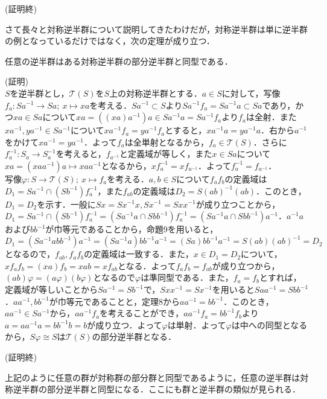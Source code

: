\documentclass{jsarticle}
\begin{document}
\begin{flushright}
(証明終)
\end{flushright}
さて長々と対称逆半群について説明してきたわけだが，対称逆半群は単に逆半群の例となっているだけではなく，次の定理が成り立つ．
\begin{thm}
任意の逆半群はある対称逆半群の部分逆半群と同型である．
\end{thm}
(証明)\\
$S$を逆半群とし，${\mathscr T}(S)$を$S$上の対称逆半群とする．$a\in S$に対して，写像$f_a:Sa^{-1}\rightarrow Sa;\:x\mapsto xa$を考える．$Sa^{-1}\subset S$より$Sa^{-1}f_a=Sa^{-1}a\subset Sa$であり，かつ$xa\in Sa$について$xa=((xa)a^{-1})a\in Sa^{-1}a=Sa^{-1}f_a$より$f_a$は全射．また$xa^{-1},ya^{-1}\in Sa^{-1}$について$xa^{-1}f_a=ya^{-1}f_a$とすると，$xa^{-1}a=ya^{-1}a$．右から$a^{-1}$をかけて$xa^{-1}=ya^{-1}$．よって$f_a$は全単射となるから，$f_a\in{\mathscr T}(S)$．さらに$f_a^{-1}:S_a\rightarrow S_a^{-1}$を考えると，$f_{a^{-1}}$と定義域が等しく，また$x\in Sa$について$xa=(xaa^{-1})a\mapsto xaa^{-1}$となるから，$xf_a^{-1}=xf_{a^{-1}}$．よって$f_a^{-1}=f_{a^{-1}}$．\\
写像$\varphi:S\rightarrow{\mathscr T}(S);\:x\mapsto f_a$を考える．$a,b\in S$について$f_af_b$の定義域は$D_1=Sa^{-1}\cap (Sb^{-1})f_a^{-1}$，また$f_{ab}$の定義域は$D_2=S(ab)^{-1}(ab)$．このとき，$D_1=D_2$を示す．一般に$Sx=Sx^{-1}x,Sx^{-1}=Sxx^{-1}$が成り立つことから，$D_1=Sa^{-1}\cap (Sb^{-1})f_a^{-1}=(Sa^{-1}a\cap Sbb^{-1})f_a^{-1}=(Sa^{-1}a\cap Sbb^{-1})a^{-1}$．$a^{-1}a$および$bb^{-1}$が巾等元であることから，命題9を用いると，$D_1=(Sa^{-1}abb^{-1})a^{-1}=(Sa^{-1}a)bb^{-1}a^{-1}=(Sa)bb^{-1}a^{-1}=S(ab)(ab)^{-1}=D_2$となるので，$f_{ab},f_af_b$の定義域は一致する．また，$x\in D_1=D_2$について，
$xf_af_b=(xa)f_b=xab=xf_{ab}$となる．よって$f_af_b=f_{ab}$が成り立つから，$(ab)\varphi=(a\varphi)(b\varphi)$となるので$\varphi$は準同型である．また，$f_a=f_b$とすれば，定義域が等しいことから$Sa^{-1}=Sb^{-1}$で，$Sxx^{-1}=Sx^{-1}$を用いると$Saa^{-1}=Sbb^{-1}$．$aa^{-1},bb^{-1}$が巾等元であることと，定理8から$aa^{-1}=bb^{-1}$．このとき，$aa^{-1}\in Sa^{-1}$から，$aa^{-1}f_a$を考えることができ，$aa^{-1}f_a=bb^{-1}f_b$より$a=aa^{-1}a=bb^{-1}b=b$が成り立つ．よって$\varphi$は単射．よって$\varphi$は中への同型となるから，$S\varphi\cong S$は${\mathscr T}(S)$の部分逆半群となる．
\begin{flushright}
(証明終)
\end{flushright}
上記のように任意の群が対称群の部分群と同型であるように，任意の逆半群は対称逆半群の部分逆半群と同型になる．ここにも群と逆半群の類似が見られる．
\end{document}
